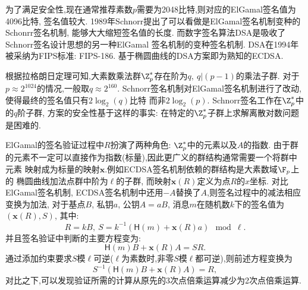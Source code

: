 为了满足安全性,现在通常推荐素数$p$需要为2048比特,则对应的ElGamal签名值为4096比特,
签名值较大. 1989年Schnorr提出了可以看做是ElGamal签名机制变种的Schonrr签名机制,
能够大大缩短签名值的长度. 而数字签名算法DSA是吸收了Schnorr签名设计思想的另一种ElGamal
签名机制的变种签名机制. DSA在1994年被采纳为FIPS标准: FIPS-186.
基于椭圆曲线的DSA方案即为熟知的ECDSA.

根据拉格朗日定理可知,大素数乘法群$\Z^*_p$存在阶为$q,\ q | (p-1)$的乘法子群.
对于$p\approx2^{1024}$的情况,一般取$q \approx2^{160}$.
Schnorr签名机制对ElGamal签名机制进行了改动,使得最终的签名值只有$2\log_2(q)$比特
而非$2\log_2(p)$. Schnorr签名工作在$\Z^*_p$中的$q$阶子群,
方案的安全性基于这样的事实: 在特定的$\Z^*_p$子群上求解离散对数问题是困难的.

ElGamal的签名验证过程中$R$扮演了两种角色: $\Z^*_p$中的元素以及$A$的指数.
由于群的元素不一定可以直接作为指数(标量),因此更广义的群结构通常需要一个将群中元素
映射成为标量的映射$\mathbf{x}$.例如ECDSA签名机制依赖的群结构是大素数域$\F_p$上的
椭圆曲线加法点群中阶为$\ell$的子群, 而映射$\mathbf{x}(R)$定义为点$R$的$x$坐标.
对比ElGamal签名机制, ECDSA签名机制中还用$-A$替换了$A$,则签名过程中的减法相应
变换为加法, 对于基点$B$, 私钥$a$, 公钥$A = aB$, 
消息$m$在随机数$k$下的签名值为$(\mathbf{x}(R),S)$, 其中:
$$R = kB, \ S = k^{-1}(\textsf{H}(m) + \mathbf{x}(R)a) \mod \ell.$$
并且签名验证中判断的主要方程变为: 
$$\textsf{H}(m)B + \mathbf{x}(R)A = SR.$$
通过添加约束要求$S$模$\ell$可逆($\ell$为素数时,非零$S$模$\ell$都可逆),则前述方程变换为
$$S^{-1}\left(\textsf{H}(m)B + \mathbf{x}(R)A\right) = R,$$
对比之下,可以发现验证所需的计算从原先的3次点倍乘运算减少为2次点倍乘运算.

